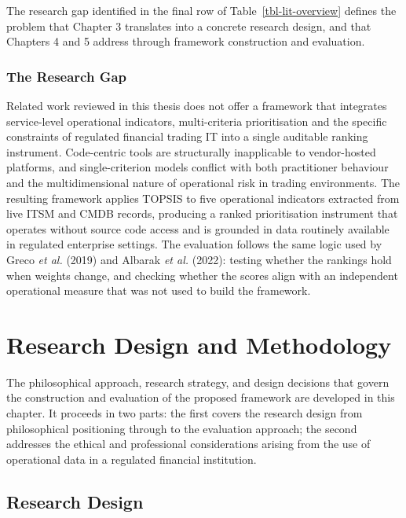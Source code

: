 \documentclass[
  12pt,
  letterpaper,
  12pt,
  oneside,
  english,
  onehalfspacing,
  headsepline]{MastersDoctoralThesis}
\begin{document}
The research gap identified in the final row of
Table~\ref{tbl-lit-overview} defines the problem that Chapter 3
translates into a concrete research design, and that Chapters 4 and 5
address through framework construction and evaluation.

\subsection{The Research Gap}\label{the-research-gap}

Related work reviewed in this thesis does not offer a framework that
integrates service-level operational indicators, multi-criteria
prioritisation and the specific constraints of regulated financial
trading IT into a single auditable ranking instrument. Code-centric
tools are structurally inapplicable to vendor-hosted platforms, and
single-criterion models conflict with both practitioner behaviour and
the multidimensional nature of operational risk in trading environments.
The resulting framework applies TOPSIS to five operational indicators
extracted from live ITSM and CMDB records, producing a ranked
prioritisation instrument that operates without source code access and
is grounded in data routinely available in regulated enterprise
settings. The evaluation follows the same logic used by Greco \emph{et
al.} (2019) and Albarak \emph{et al.} (2022): testing whether the
rankings hold when weights change, and checking whether the scores align
with an independent operational measure that was not used to build the
framework.


\chapter{Research Design and Methodology}\label{sec-chapter3}

The philosophical approach, research strategy, and design decisions that
govern the construction and evaluation of the proposed framework are
developed in this chapter. It proceeds in two parts: the first covers
the research design from philosophical positioning through to the
evaluation approach; the second addresses the ethical and professional
considerations arising from the use of operational data in a regulated
financial institution.

\section{Research Design}\label{research-design}
\end{document}
